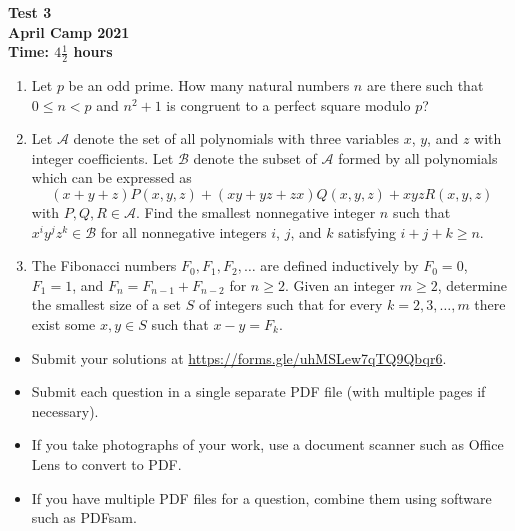 \documentclass{article}
\begin{document}
\thispagestyle{empty}

\begin{center}
  \textbf{\Large Test 3}
  \\ \vspace{1em}
  \textbf{\large April Camp 2021}
  \\ \vspace{1em}
  \textbf{\large Time: $4\frac{1}{2}$ hours}
\end{center}

\vfill

\begin{enumerate}[leftmargin=0pt, itemsep=18pt]

\item %
Let $p$ be an odd prime.
How many natural numbers $n$ are there such that $0 \leq n < p$ and $n^2 + 1$ is congruent to a perfect square modulo $p$?


\item %
Let $\mathcal{A}$ denote the set of all polynomials with three variables $x$, $y$, and $z$ with integer coefficients.
Let $\mathcal{B}$ denote the subset of $\mathcal{A}$ formed by all polynomials which can be expressed as
\[ (x+y+z) P(x,y,z) +(xy+yz+zx) Q(x,y,z) +xyz R(x,y,z) \]
with $P, Q, R \in \mathcal{A}$.
Find the smallest nonnegative integer $n$ such that $x^i y^j z^k \in \mathcal{B}$ for all nonnegative integers $i$, $j$, and $k$ satisfying $i+j+k \geq n$.


\item %
The Fibonacci numbers $F_0, F_1, F_2, \dotsc$ are defined inductively by $F_0 = 0$, $F_1 = 1$, and $F_n = F_{n-1} +F_{n-2}$ for $n \geq 2$.
Given an integer $m \geq 2$, determine the smallest size of a set $S$ of integers such that for every $k = 2, 3, \dotsc, m$ there exist some $x, y \in S$ such that $x-y = F_k$.

\end{enumerate}


\vfill
\vfill
\begin{itemize}
	\item Submit your solutions at \url{https://forms.gle/uhMSLew7qTQ9Qbqr6}.
	\item Submit each question in a single separate PDF file (with multiple pages if necessary).
	\item If you take photographs of your work, use a document scanner such as Office Lens to convert to PDF.
	\item If you have multiple PDF files for a question, combine them using software such as PDFsam.
\end{itemize}
\end{document}
